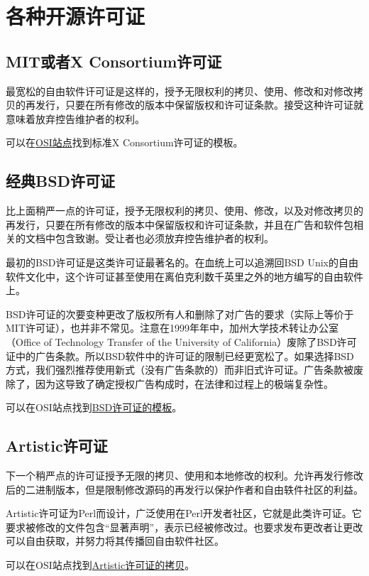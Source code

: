 \documentclass[12pt,oneside]{book}
\begin{document}
\section{各种开源许可证}
\subsection{MIT或者X Consortium许可证}
最宽松的自由软件讦可证是这样的，授予无限权利的拷贝、使用、修改和对修改拷贝的再发行，只要在所有修改的版本中保留版权和许可证条款。接受这种许可证就意味着放弃控告维护者的权利。

可以在\href{http://www.opensource.org/licenses/mit-license.html}{OSI站点}找到标准X Consortium许可证的模板。

\subsection{经典BSD许可证}
比上面稍严一点的许可证，授予无限权利的拷贝、使用、修改，以及对修改拷贝的再发行，只要在所有修改的版本中保留版权和许可证条款，并且在广告和软件包相关的文档中包含致谢。受让者也必须放弃控告维护者的权利。

最初的BSD许可证是这类许可证最著名的。在血统上可以追溯回BSD Unix的自由软件文化中，这个许可证甚至使用在离伯克利数千英里之外的地方编写的自由软件上。

BSD许可证的次要变种更改了版权所有人和删除了对广告的要求（实际上等价于MIT许可证），也并非不常见。注意在1999年年中，加州大学技术转让办公室（Office of Technology Transfer of the University of California）废除了BSD许可证中的广告条款。所以BSD软件中的许可证的限制已经更宽松了。如果选择BSD方式，我们强烈推荐使用新式（没有广告条款的）而非旧式许可证。广告条款被废除了，因为这导致了确定授权广告构成时，在法律和过程上的极端复杂性。

可以在OSI站点找到\href{http://www.opensource.org/licenses/bsd-license.html}{BSD许可证的模板}。

\subsection{Artistic许可证}
下一个稍严点的许可证授予无限的拷贝、使用和本地修改的权利。允许再发行修改后的二进制版本，但是限制修改源码的再发行以保护作者和自由轶件社区的利益。

Artistic许可证为Perl而设计，广泛使用在Perl开发者社区，它就是此类许可证。它要求被修改的文件包含“显著声明”，表示已经被修改过。也要求发布更改者让更改可以自由获取，并努力将其传播回自由软件社区。

可以在OSI站点找到\href{http://www.opensource.org/licenses/artistic-license.html}{Artistic许可证的拷贝}。
\end{document}
